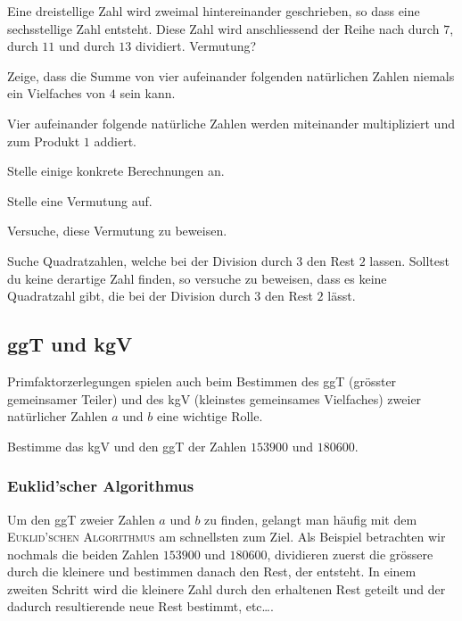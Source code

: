 \documentclass[%
11pt,%
twoside,%
titlepage,%
german,%
headsepline%
]{scrartcl}
\begin{document}
\begin{ueb}[teilen]
Eine dreistellige Zahl wird zweimal hintereinander geschrieben, so dass eine sechsstellige Zahl entsteht. Diese Zahl wird anschliessend der Reihe nach durch $7$, durch $11$ und durch $13$ dividiert. Vermutung?
\end{ueb}

\begin{ueb}[Vierfache]
Zeige, dass die Summe von vier aufeinander folgenden natürlichen Zahlen niemals ein Vielfaches von $4$ sein kann.
\end{ueb}

\begin{ueb}[Vierersumme]
Vier aufeinander folgende natürliche Zahlen werden miteinander multipliziert und zum Produkt $1$ addiert.
\begin{enumeratea}
    \item Stelle einige konkrete Berechnungen an.
    \item Stelle eine Vermutung auf.
    \item Versuche, diese Vermutung zu beweisen.
\end{enumeratea}
\end{ueb}

\begin{ueb}[Quadratzahlen]
Suche Quadratzahlen, welche bei der Division durch $3$ den Rest $2$ lassen. Solltest du keine derartige Zahl finden, so versuche zu beweisen, dass es keine Quadratzahl gibt, die bei der Division durch $3$ den Rest $2$ lässt.
\end{ueb}

\subsection{ggT und kgV}
Primfaktorzerlegungen spielen auch beim Bestimmen des ggT (grösster gemeinsamer Teiler) und des kgV (kleinstes gemeinsames Vielfaches) zweier natürlicher Zahlen $a$ und $b$ eine wichtige Rolle.

\begin{ueb}
Bestimme das kgV und den ggT der Zahlen $153900$ und $180600$.
\end{ueb}

\subsubsection{Euklid'scher Algorithmus}

Um den ggT zweier Zahlen $a$ und $b$ zu finden, gelangt man häufig mit dem \textsc{Euklid'schen Algorithmus} am schnellsten zum Ziel. Als Beispiel betrachten wir nochmals die beiden Zahlen $153900$ und $180600$, dividieren zuerst die grössere durch die kleinere und bestimmen danach den Rest, der entsteht.
In einem zweiten Schritt wird die kleinere Zahl durch den erhaltenen Rest geteilt und der dadurch resultierende neue Rest bestimmt, etc\dots.
\end{document}
